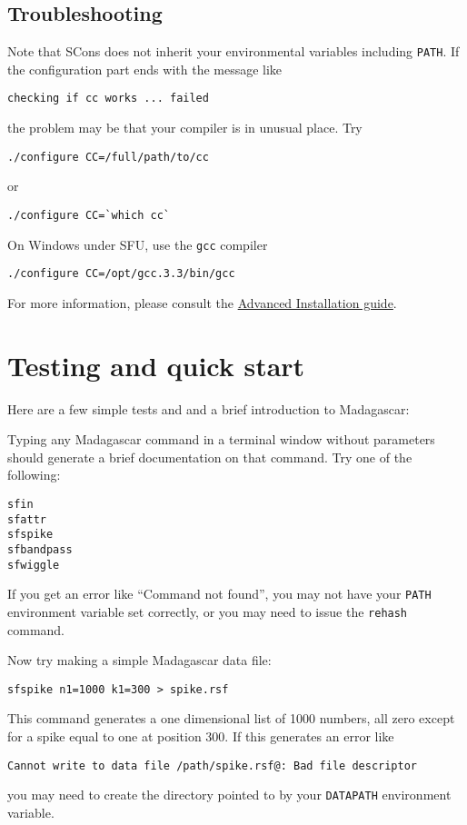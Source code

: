 \subsection{Troubleshooting}

Note that SCons does not inherit your environmental variables including
\texttt{PATH}. If the configuration part ends with the message like
\begin{verbatim}
checking if cc works ... failed
\end{verbatim}
the problem may be that your compiler is in unusual place. Try
\begin{verbatim}
./configure CC=/full/path/to/cc
\end{verbatim}
or
\begin{verbatim}
./configure CC=`which cc` 
\end{verbatim}

On Windows under SFU, use the \texttt{gcc} compiler
\begin{verbatim}
./configure CC=/opt/gcc.3.3/bin/gcc
\end{verbatim}

For more information, please consult the \href{http://rsf.sourceforge.net/Advanced_Installation}{Advanced Installation guide}.

\section{Testing and quick start}

Here are a few simple tests and and a brief introduction to Madagascar:

Typing any Madagascar command in a terminal window without parameters
should generate a brief documentation on that command. Try one of the
following:
\begin{verbatim}
sfin
sfattr
sfspike
sfbandpass
sfwiggle
\end{verbatim}

If you get an error like ``Command not found'', you may not have your
\texttt{PATH} environment variable set correctly, or you may need to issue the
\texttt{rehash} command.

Now try making a simple Madagascar data file:
\begin{verbatim}
sfspike n1=1000 k1=300 > spike.rsf
\end{verbatim}
This command generates a one dimensional list of 1000 numbers, all zero
except for a spike equal to one at position 300. If this generates an
error like
\begin{verbatim}
Cannot write to data file /path/spike.rsf@: Bad file descriptor
\end{verbatim}
you may need to create the directory pointed to by your \texttt{DATAPATH}
environment variable.

